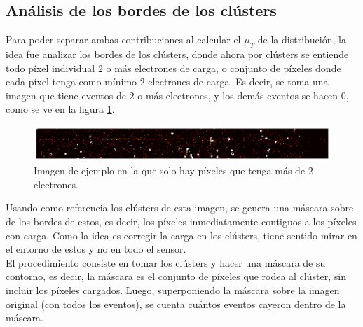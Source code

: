 \subsection{Análisis de los bordes de los clústers}
\noindent Para poder separar ambas contribuciones al calcular el $\mu_{T}$ de la distribución, la idea fue analizar los bordes de los clústers, donde ahora por clústers se entiende todo píxel individual $2$ o más electrones de carga, o conjunto de píxeles donde cada píxel tenga como mínimo $2$ electrones de carga. Es decir, se toma una imagen que tiene eventos de $2$ o más electrones, y los demás eventos se hacen $0$, como se ve en la figura \ref{fig:ImagenFits2omasElectrones}.
\begin{figure}[h]
    \centering
    \includegraphics[scale=0.4]{Figs/imagen_fits_2_o_mas.pdf}
    \caption{\footnotesize{Imagen de ejemplo en la que solo hay píxeles que tenga más de $2$ electrones.}}
    \label{fig:ImagenFits2omasElectrones}
\end{figure}
Usando como referencia los clústers de esta imagen, se genera una máscara sobre de los bordes de estos, es decir, los píxeles inmediatamente contiguos a los píxeles con carga. Como la idea es corregir la carga en los clústers, tiene sentido mirar en el entorno de estos y no en todo el sensor.\\
\indent El procedimiento consiste en tomar los clústers y hacer una máscara de su contorno, es decir, la máscara es el conjunto de píxeles que rodea al clúster, sin incluir los píxeles cargados. Luego, superponiendo la máscara sobre la imagen original (con todos los eventos), se cuenta cuántos eventos cayeron dentro de la máscara. 
